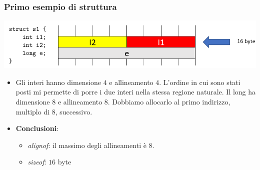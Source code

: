 			\subsubsection{Primo esempio di struttura}
			\begin{center}
				\includegraphics[scale=0.80]{img/16.PNG}
			\end{center} 
			\begin{itemize}
				\item Gli interi hanno dimensione $4$ e allineamento $4$. L'ordine in cui sono stati posti mi permette di porre i due interi nella stessa regione naturale. Il long ha dimensione $8$ e allineamento $8$. Dobbiamo allocarlo al primo indirizzo, multiplo di 8, successivo. 
				\item \textbf{Conclusioni}:\begin{itemize}
					\item \emph{alignof}: il massimo degli allineamenti è $8$.
					\item \emph{sizeof}: $16$ byte
				\end{itemize}
			\end{itemize}
